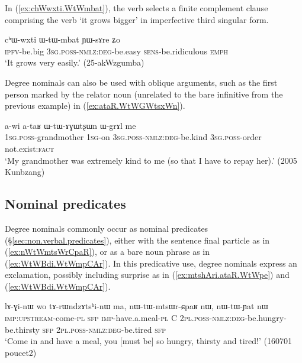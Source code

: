 In (\ref{ex:chWwxti.WtWmbat}), the verb  selects a finite complement clause comprising the verb  `it grows bigger' in imperfective third singular form.

\begin{exe}
\ex \label{ex:chWwxti.WtWmbat}
\gll cʰɯ-wxti ɯ-tɯ-mbat ɲɯ-sɤre ʑo \\
\textsc{ipfv}-be.big  \textsc{3sg}.\textsc{poss}-\textsc{nmlz}:\textsc{deg}-be.easy \textsc{sens}-be.ridiculous \textsc{emph} \\ 
\glt `It grows very easily.' (25-akWzgumba) 
\end{exe}

Degree nominals can also be used with oblique arguments, such as the first person marked by the relator noun  (unrelated to the bare infinitive  from the previous example) in (\ref{ex:ataR.WtWGWtsxWn}).


\begin{exe}
\ex \label{ex:ataR.WtWGWtsxWn}
\gll a-wi a-taʁ ɯ-tɯ-ɤɣɯtʂɯn ɯ-grɤl me \\
\textsc{1sg}.\textsc{poss}-grandmother \textsc{1sg}-on \textsc{3sg}.\textsc{poss}-\textsc{nmlz}:\textsc{deg}-be.kind \textsc{3sg}.\textsc{poss}-order not.exist:\textsc{fact} \\
\glt `My grandmother was extremely kind to me (so that I have to repay her).' (2005 Kunbzang)
\end{exe}


\subsection{Nominal predicates} \label{sec:degree.nominal.predicates}
Degree nominals commonly occur as nominal predicates (§\ref{sec:non.verbal.predicates}), either with the sentence final particle  as in (\ref{ex:nWtWmtsWrCpaR}), or as a bare noun phrase as in (\ref{ex:WtWBdi.WtWmpCAr}). In this predicative use, degree nominals express an exclamation, possibly including surprise as in (\ref{ex:mtshAri.ataR.WtWpe}) and (\ref{ex:WtWBdi.WtWmpCAr}).

\begin{exe}
\ex \label{ex:nWtWmtsWrCpaR}
\gll lɤ-ɣi-nɯ wo tɤ-rɯndzɤtsʰi-nɯ ma, nɯ-tɯ-mtsɯr-ɕpaʁ nɯ, nɯ-tɯ-ɲat nɯ\\
\textsc{imp}:\textsc{upstream}-come-\textsc{pl} \textsc{sfp} \textsc{imp}-have.a.meal-\textsc{pl} C \textsc{2pl}.\textsc{poss}-\textsc{nmlz}:\textsc{deg}-be.hungry-be.thirsty \textsc{sfp} \textsc{2pl}.\textsc{poss}-\textsc{nmlz}:\textsc{deg}-be.tired \textsc{sfp} \\
\glt `Come in and have a meal, you [must be] so hungry, thirsty and tired!' (160701 poucet2)	
\end{exe}

